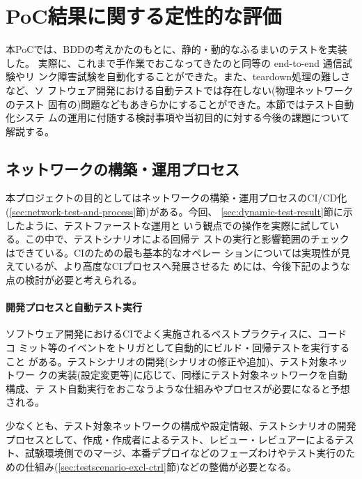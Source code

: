\section{PoC結果に関する定性的な評価}

本PoCでは、BDDの考えかたのもとに、静的・動的なふるまいのテストを実装した。
実際に、これまで手作業でおこなってきたのと同等の end-to-end 通信試験やリ
ンク障害試験を自動化することができた。また、teardown処理の難しさなど、ソ
フトウェア開発における自動テストでは存在しない(物理ネットワークのテスト
固有の)問題などもあきらかにすることができた。本節ではテスト自動化システ
ムの運用に付随する検討事項や当初目的に対する今後の課題について解説する。

  \subsection{ネットワークの構築・運用プロセス}

本プロジェクトの目的としてはネットワークの構築・運用プロセスのCI/CD化
(\ref{sec:network-test-and-process}節)がある。今回、
\ref{sec:dynamic-test-result}節に示したように、テストファーストな運用と
いう観点での操作を実際に試している。この中で、テストシナリオによる回帰テ
ストの実行と影響範囲のチェックはできている。CIのための最も基本的なオペレー
ションについては実現性が見えているが、より高度なCIプロセスへ発展させるた
めには、今後下記のような点の検討が必要と考えられる。

    \paragraph{開発プロセスと自動テスト実行}
ソフトウェア開発におけるCIでよく実施されるベストプラクティスに、コードコ
ミット等のイベントをトリガとして自動的にビルド・回帰テストを実行すること
がある。テストシナリオの開発(シナリオの修正や追加)、テスト対象ネットワー
クの実装(設定変更等)に応じて、同様にテスト対象ネットワークを自動構成、テ
スト自動実行をおこなうような仕組みやプロセスが必要になると予想される。

少なくとも、テスト対象ネットワークの構成や設定情報、テストシナリオの開発
プロセスとして、作成・作成者によるテスト、レビュー・レビュアーによるテス
ト、試験環境側でのマージ、本番デプロイなどのフェーズわけやテスト実行のた
めの仕組み(\ref{sec:testscenario-excl-ctrl}節)などの整備が必要となる。

